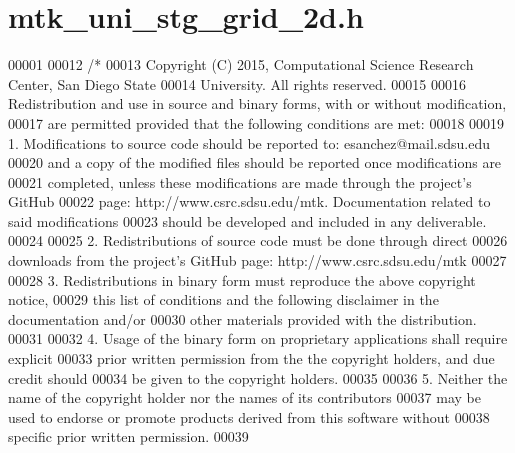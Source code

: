 \hypertarget{mtk__uni__stg__grid__2d_8h_source}{\section{mtk\+\_\+uni\+\_\+stg\+\_\+grid\+\_\+2d.\+h}
\label{mtk__uni__stg__grid__2d_8h_source}
}

\begin{DoxyCode}
00001 
00012 \textcolor{comment}{/*}
00013 \textcolor{comment}{Copyright (C) 2015, Computational Science Research Center, San Diego State}
00014 \textcolor{comment}{University. All rights reserved.}
00015 \textcolor{comment}{}
00016 \textcolor{comment}{Redistribution and use in source and binary forms, with or without modification,}
00017 \textcolor{comment}{are permitted provided that the following conditions are met:}
00018 \textcolor{comment}{}
00019 \textcolor{comment}{1. Modifications to source code should be reported to: esanchez@mail.sdsu.edu}
00020 \textcolor{comment}{and a copy of the modified files should be reported once modifications are}
00021 \textcolor{comment}{completed, unless these modifications are made through the project's GitHub}
00022 \textcolor{comment}{page: http://www.csrc.sdsu.edu/mtk. Documentation related to said modifications}
00023 \textcolor{comment}{should be developed and included in any deliverable.}
00024 \textcolor{comment}{}
00025 \textcolor{comment}{2. Redistributions of source code must be done through direct}
00026 \textcolor{comment}{downloads from the project's GitHub page: http://www.csrc.sdsu.edu/mtk}
00027 \textcolor{comment}{}
00028 \textcolor{comment}{3. Redistributions in binary form must reproduce the above copyright notice,}
00029 \textcolor{comment}{this list of conditions and the following disclaimer in the documentation and/or}
00030 \textcolor{comment}{other materials provided with the distribution.}
00031 \textcolor{comment}{}
00032 \textcolor{comment}{4. Usage of the binary form on proprietary applications shall require explicit}
00033 \textcolor{comment}{prior written permission from the the copyright holders, and due credit should}
00034 \textcolor{comment}{be given to the copyright holders.}
00035 \textcolor{comment}{}
00036 \textcolor{comment}{5. Neither the name of the copyright holder nor the names of its contributors}
00037 \textcolor{comment}{may be used to endorse or promote products derived from this software without}
00038 \textcolor{comment}{specific prior written permission.}
00039 \textcolor{comment}{}

\end{DoxyCode}
